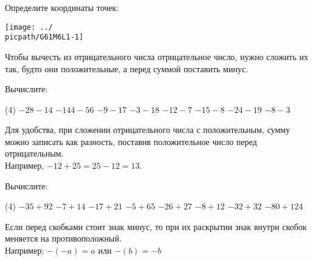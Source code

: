 %
%

\begin{class}[number=1]
	\begin{listofex}
		\item
		\begin{minipage}[t]{\bodywidth}
			Определите координаты точек:
		\end{minipage}
		\begin{minipage}[c]{0.45\textwidth}
			\texttt{[image: ../\\picpath/G61M6L1-1]}
		\end{minipage}
	\end{listofex}
\begin{definit}
Чтобы вычесть из отрицательного числа отрицательное число, нужно сложить их так, будто они положительные, а перед суммой поставить минус.
\end{definit}
\begin{listofex}[resume]
\item Вычислите:
\begin{tasks}(4)
	\task \( -28-14 \)
	\task \( -144-56 \)
	\task \( -9-17 \)
	\task \( -3-18 \)
	\task \( -12-7 \)
	\task \( -15-8 \)
	\task \( -24-19 \)
	\task \( -8-3 \)
\end{tasks}
\end{listofex}
\begin{definit}
Для удобства, при сложении отрицательного числа с положительным, сумму можно записать как разность, поставив положительное число перед отрицательным. \\ Например, \(-12+25=25-12=13\).
\end{definit}
\begin{listofex}[resume]
\item Вычислите:
\begin{tasks}(4)
	\task \( -35 + 92 \)
	\task \( -7+14 \)
	\task \( -17+21 \)
	\task \( -5+65 \)
	\task \( -26+27 \)
	\task \( -8+12 \)
	\task \( -32+32 \)
	\task \( -80+124 \)
\end{tasks}
\end{listofex}
\begin{definit}
Если перед скобками стоит знак минус, то при их раскрытии знак внутри скобок меняется на противоположный. \\ Например: \(-(-a) = a \) или \( -(b) = -b \)
\end{definit}
\begin{listofex}[resume]

\end{listofex}
\end{class}
